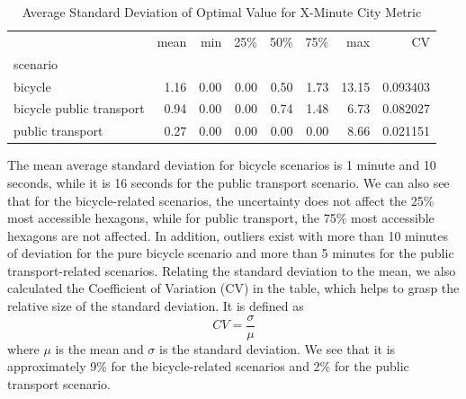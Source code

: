 \begin{table}
  \caption{Average Standard Deviation of Optimal Value for X-Minute City Metric}
  \label{tab:average_standard_deviation_of_optimal_value_for_x_minute_city_metric}
  \begin{center}
    \begin{tabular}{lrrrrrrr}
     & mean & min & 25\% & 50\% & 75\% & max & CV \\
    scenario &  &  &  &  &  &  &  \\
    bicycle & 1.16 & 0.00 & 0.00 & 0.50 & 1.73 & 13.15 & 0.093403 \\
    bicycle public transport & 0.94 & 0.00 & 0.00 & 0.74 & 1.48 & 6.73 & 0.082027 \\
    public transport & 0.27 & 0.00 & 0.00 & 0.00 & 0.00 & 8.66 & 0.021151 \\
    \end{tabular}
  \end{center}
\end{table}


The mean average standard deviation for bicycle scenarios is 1 minute and 10 seconds, while it is 16 seconds for the public transport scenario.
We can also see that for the bicycle-related scenarios, the uncertainty does not affect the 25\% most accessible hexagons, while for public transport, the 75\% most accessible hexagons are not affected.
In addition, outliers exist with more than 10 minutes of deviation for the pure bicycle scenario and more than 5 minutes for the public transport-related scenarios.
Relating the standard deviation to the mean, we also calculated the Coefficient of Variation (CV) in the table, which helps to grasp the relative size of the standard deviation.
It is defined as
$$ CV = \frac{\sigma}{\mu} $$
where $\mu$ is the mean and $\sigma$ is the standard deviation.
We see that it is approximately 9\% for the bicycle-related scenarios and 2\% for the public transport scenario.

